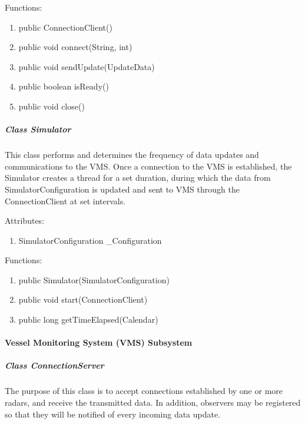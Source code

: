 \documentclass{article}
\begin{document}
\vspace{0.5cm}

Functions:
\begin{enumerate}
	\item public ConnectionClient()
	\item public void connect(String, int)
	\item public void sendUpdate(UpdateData)
	\item public boolean isReady()
	\item public void close()
\end{enumerate}

\subparagraph{Class Simulator}
This class performs and determines the frequency of data updates and communications to the VMS. Once a connection to the VMS is established, the Simulator creates a thread for a set duration, during which the data from SimulatorConfiguration is updated and sent to VMS through the ConnectionClient at set intervals.

\vspace{0.5cm}

Attributes:
\begin{enumerate}
	\item SimulatorConfiguration \_Configuration
\end {enumerate}

\vspace{0.5cm}

Functions:
\begin{enumerate}
	\item public Simulator(SimulatorConfiguration)
	\item public void start(ConnectionClient)
	\item public long getTimeElapsed(Calendar)
\end{enumerate}

\vspace{0.25cm}

\paragraph{Vessel Monitoring System (VMS) Subsystem}

\subparagraph{Class ConnectionServer}
The purpose of this class is to accept connections established by one or more radars, and receive the transmitted data. In addition, observers may be registered so that they will be notified of every incoming data update.

\vspace{0.5cm}
\end{document}
